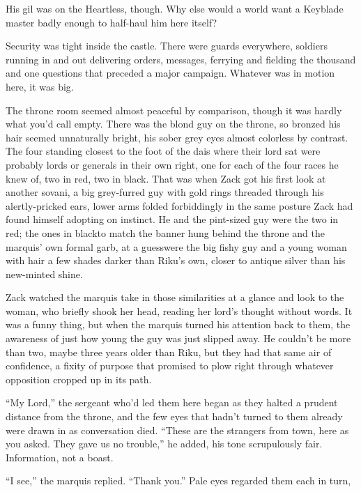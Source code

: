 His gil was on the Heartless, though. Why else would a world want a Keyblade master badly enough to half-haul him here itself?

Security was tight inside the castle. There were guards everywhere, soldiers running in and out delivering orders, messages, ferrying and fielding the thousand and one questions that preceded a major campaign. Whatever was in motion here, it was big.

The throne room seemed almost peaceful by comparison, though it was hardly what you'd call empty. There was the blond guy on the throne, so bronzed his hair seemed unnaturally bright, his sober grey eyes almost colorless by contrast. The four standing closest to the foot of the dais where their lord sat were probably lords or generals in their own right, one for each of the four races he knew of, two in red, two in black. That was when Zack got his first look at another sovani, a big grey-furred guy with gold rings threaded through his alertly-pricked ears, lower arms folded forbiddingly in the same posture Zack had found himself adopting on instinct. He and the pint-sized guy were the two in red; the ones in black\textemdash to match the banner hung behind the throne and the marquis' own formal garb, at a guess\textemdash were the big fishy guy and a young woman with hair a few shades darker than Riku's own, closer to antique silver than his new-minted shine.

Zack watched the marquis take in those similarities at a glance and look to the woman, who briefly shook her head, reading her lord's thought without words. It was a funny thing, but when the marquis turned his attention back to them, the awareness of just how young the guy was just slipped away. He couldn't be more than two, maybe three years older than Riku, but they had that same air of confidence, a fixity of purpose that promised to plow right through whatever opposition cropped up in its path.

``My Lord,'' the sergeant who'd led them here began as they halted a prudent distance from the throne, and the few eyes that hadn't turned to them already were drawn in as conversation died. ``These are the strangers from town, here as you asked. They gave us no trouble,'' he added, his tone scrupulously fair. Information, not a boast.

``I see,'' the marquis replied. ``Thank you.'' Pale eyes regarded them each in turn, giving nothing away, but it took more than a level stare to cow a SOLDIER. He was rather more impressed by how quickly the marquis sized them up\textemdash twelve troops and one civilian\textemdash and made none of the perfectly reasonable assumptions another might have on seeing Zack standing side-by-side with Riku, not a deferential pace behind and to the left. ``You aren't Fourth Committee,'' the marquis stated neutrally, addressing Riku directly.

